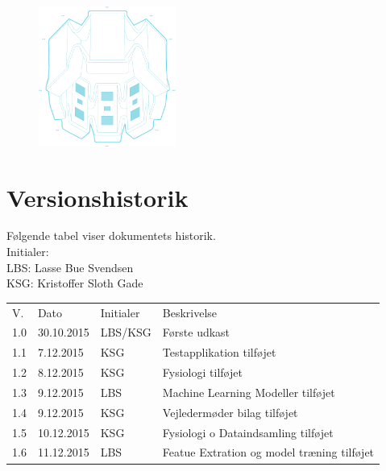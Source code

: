 \documentclass[pdftex, 11pt, a4paper, twoside, danish]{memoir}
\begin{document}
    \begin{titlingpage}
%        
		\begin{figure}[ht] 
			\centering 
			\includegraphics[width=0.4\textwidth]{figure/myo_image_live}  
		\end{figure}
    \end{titlingpage}
    
    
    
    
    \bgroup
	    \tableofcontents*	%
    \egroup
    \section*{Versionshistorik}
    Følgende tabel viser dokumentets historik.\\    
    Initialer:\\
    LBS: Lasse Bue Svendsen\\
    KSG: Kristoffer Sloth Gade
    \bgroup
    \def\arraystretch{1.8}
    \begin{center}
    	\begin{tabular}{lllp{206pt}}
    		\rowcolor{grey} V.	& Dato 		& Initialer & Beskrivelse \\
    		1.0	& 30.10.2015 	& LBS/KSG	& Første udkast\\
    		1.1	& 7.12.2015 	& KSG		& Testapplikation tilføjet\\
    		1.2 & 8.12.2015		& KSG		& Fysiologi tilføjet\\
    		1.3	& 9.12.2015		& LBS		& Machine Learning Modeller tilføjet\\
    		1.4 & 9.12.2015		& KSG		& Vejledermøder bilag tilføjet\\
    		1.5 & 10.12.2015	& KSG		& Fysiologi o Dataindsamling tilføjet\\
    		1.6 & 11.12.2015	& LBS		& Featue Extration og model træning tilføjet
    	\end{tabular}
    \end{center}
    \egroup
    
\end{document}
